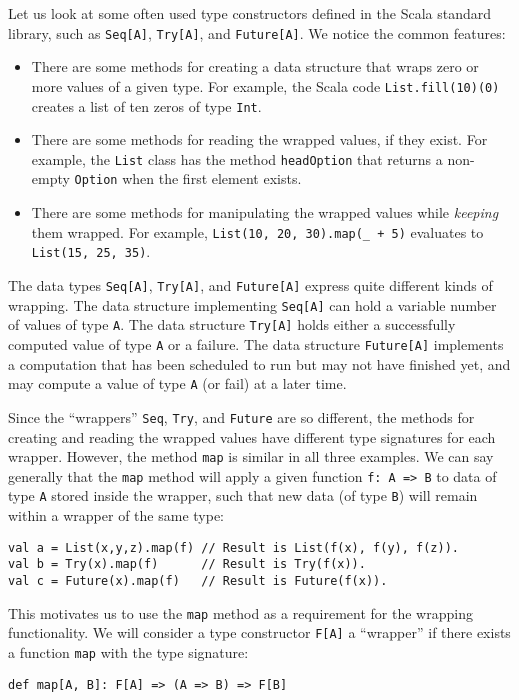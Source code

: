 Let us look at some often used type constructors defined in the Scala
standard library, such as \lstinline!Seq[A]!, \lstinline!Try[A]!,
and \lstinline!Future[A]!. We notice the common features:
\begin{itemize}
\item There are some methods for creating a data structure that wraps zero
or more values of a given type. For example, the Scala code \lstinline!List.fill(10)(0)!
creates a list of ten zeros of type \lstinline!Int!.
\item There are some methods for reading the wrapped values, if they exist.
For example, the \lstinline!List! class has the method \lstinline!headOption!
that returns a non-empty \lstinline!Option! when the first element
exists.
\item There are some methods for manipulating the wrapped values while \emph{keeping}
them wrapped. For example, \lstinline!List(10, 20, 30).map(_ + 5)!
evaluates to \lstinline!List(15, 25, 35)!.
\end{itemize}
The data types \lstinline!Seq[A]!, \lstinline!Try[A]!, and \lstinline!Future[A]!
express quite different kinds of wrapping. The data structure implementing
\lstinline!Seq[A]! can hold a variable number of values of type \lstinline!A!.
The data structure \lstinline!Try[A]! holds either a successfully
computed value of type \lstinline!A! or a failure. The data structure
\lstinline!Future[A]! implements a computation that has been scheduled
to run but may not have finished yet, and may compute a value of type
\lstinline!A! (or fail) at a later time.

Since the \textsf{``}wrappers\textsf{''} \lstinline!Seq!, \lstinline!Try!, and \lstinline!Future!
are so different, the methods for creating and reading the wrapped
values have different type signatures for each wrapper. However, the
method \lstinline!map! is similar in all three examples. We can say
generally that the \lstinline!map! method will apply a given function
\lstinline!f: A => B! to data of type \lstinline!A! stored inside
the wrapper, such that new data (of type \lstinline!B!) will remain
within a wrapper of the same type:
\begin{lstlisting}
val a = List(x,y,z).map(f) // Result is List(f(x), f(y), f(z)).
val b = Try(x).map(f)      // Result is Try(f(x)).
val c = Future(x).map(f)   // Result is Future(f(x)).
\end{lstlisting}
This motivates us to use the \lstinline!map! method as a requirement
for the wrapping functionality. We will consider a type constructor
\lstinline!F[A]! a \textsf{``}wrapper\textsf{''} if there exists a function \lstinline!map!
with the type signature:
\begin{lstlisting}
def map[A, B]: F[A] => (A => B) => F[B]
\end{lstlisting}

